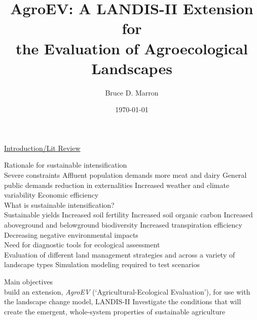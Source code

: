 \documentclass[12pt, letterpaper]{article}
\title{\vspace{-15mm}\fontsize{14pt}{10pt}
                    \selectfont \textbf{AgroEV: A LANDIS-II Extension for \\
                the Evaluation of Agroecological Landscapes}   %
                    \vspace{-5mm}
      }
\author{
     \normalsize Bruce D. Marron \\                     %
     \vspace{-5mm}
}
\date{\normalsize \today}
\begin{document}
\begin{singlespacing}
\maketitle                                      %
\end{singlespacing}
\thispagestyle{fancy}                           %

\underline{Introduction/Lit Review}\\
\begin{outline}[enumerate]
\1 Rationale for sustainable intensification\\
\citep{godfray_food_2010, parry_effects_2004, zhao_drought-induced_2010, barnosky_approaching_2012, schmidhuber_global_2007, eigenbrod_impact_2011, dodds_human_2013, rogers_facing_2008, lobell_climate_2011, wada_global_2010, tilman_forecasting_2001}
\2 Severe constraints
\3 Affluent population demands more meat and dairy
\3 General public demands reduction in externalities
\3 Increased weather and climate variability
\3 Economic efficiency\\

\1 What is sustainable intensification?\\
\citep{altieri_agroecology_2015, nicholls_plant_2013, gliessman_agroecology:_2015, baulcombe_reaping_2009}
\2 Sustainable yields
\2 Increased soil fertility
\2 Increased soil organic carbon
\2 Increased aboveground and belowground biodiversity
\2 Increased transpiration efficiency
\2 Decreasing negative environmental impacts\\

\1 Need for diagnostic tools for ecological assessment\\
\citep{rygiewicz_soil_2010, compant_stephane_plant_2010, prosser_role_2007, scheller_design_2007}
\2 Evaluation of different land management strategies and across a variety of landscape types
\2 Simulation modeling required to test scenarios

\1 Main objectives\\
\citep{scheller_design_2007, gliessman_agroecology:_2015}
\2 build an extension, \textit{AgroEV} (\enquote*{Agricultural-Ecological Evaluation}), for use with the landscape change model, LANDIS-II
\2 Investigate the conditions that will create the emergent, whole-system properties of sustainable agriculture
\end{outline}











\clearpage 
\renewcommand{\thepage}{}


\end{document}
